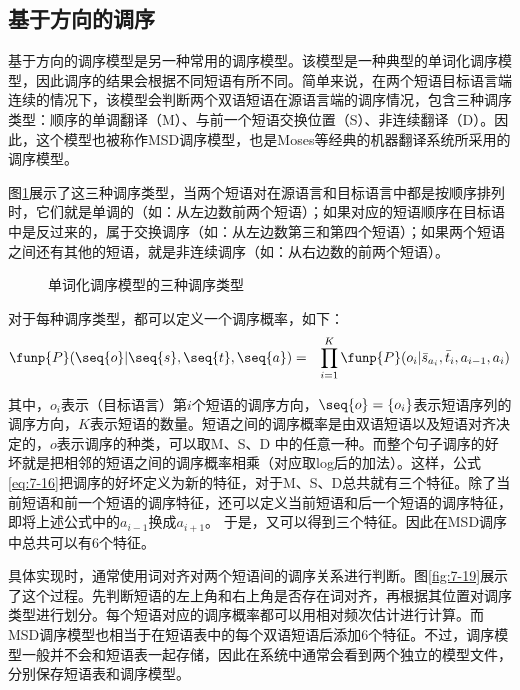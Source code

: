 
\subsection{基于方向的调序}

\parinterval 基于方向的调序模型是另一种常用的调序模型。该模型是一种典型的单词化调序模型，因此调序的结果会根据不同短语有所不同。简单来说，在两个短语目标语言端连续的情况下，该模型会判断两个双语短语在源语言端的调序情况，包含三种调序类型：顺序的单调翻译（M）、与前一个短语交换位置（S）、非连续翻译（D）。因此，这个模型也被称作MSD调序模型，也是Moses等经典的机器翻译系统所采用的调序模型。

\parinterval 图\ref{fig:7-18}展示了这三种调序类型，当两个短语对在源语言和目标语言中都是按顺序排列时，它们就是单调的（如：从左边数前两个短语）；如果对应的短语顺序在目标语中是反过来的，属于交换调序（如：从左边数第三和第四个短语）；如果两个短语之间还有其他的短语，就是非连续调序（如：从右边数的前两个短语）。

\begin{figure}[htp]
\centering

\caption{单词化调序模型的三种调序类型}
\label{fig:7-18}
\end{figure}

\parinterval 对于每种调序类型，都可以定义一个调序概率，如下：
\begin{eqnarray}
\funp{P}(\seq{o}|\seq{s},\seq{t},\seq{a}) & = & \prod_{i=1}^{K} \funp{P}(o_i| \bar{s}_{a_i}, \bar{t}_i, a_{i-1}, a_i)
\label{eq:7-16}
\end{eqnarray}

\noindent 其中，$o_i$表示（目标语言）第$i$个短语的调序方向，$\seq{o}=\{o_i\}$表示短语序列的调序方向，$K$表示短语的数量。短语之间的调序概率是由双语短语以及短语对齐决定的，$o$表示调序的种类，可以取M、S、D 中的任意一种。而整个句子调序的好坏就是把相邻的短语之间的调序概率相乘（对应取log后的加法）。这样，公式\eqref{eq:7-16}把调序的好坏定义为新的特征，对于M、S、D总共就有三个特征。除了当前短语和前一个短语的调序特征，还可以定义当前短语和后一个短语的调序特征，即将上述公式中的$a_{i-1}$换成$a_{i+1}$。 于是，又可以得到三个特征。因此在MSD调序中总共可以有6个特征。

\parinterval 具体实现时，通常使用词对齐对两个短语间的调序关系进行判断。图\ref{fig:7-19}展示了这个过程。先判断短语的左上角和右上角是否存在词对齐，再根据其位置对调序类型进行划分。每个短语对应的调序概率都可以用相对频次估计进行计算。而MSD调序模型也相当于在短语表中的每个双语短语后添加6个特征。不过，调序模型一般并不会和短语表一起存储，因此在系统中通常会看到两个独立的模型文件，分别保存短语表和调序模型。

